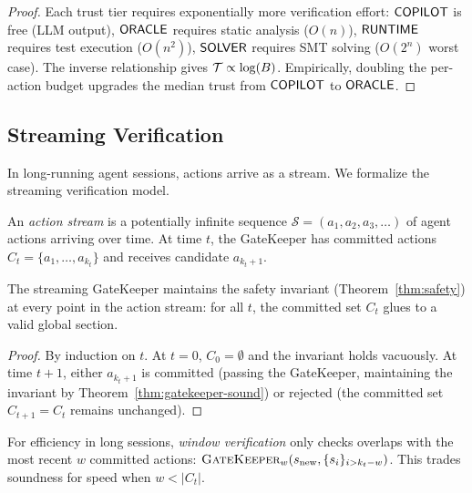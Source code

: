 \documentclass[11pt]{article}
\newcommand{\GateKeeper}{\textsc{GateKeeper}}
\begin{document}
\begin{proof}
Each trust tier requires exponentially more verification effort:
$\mathsf{COPILOT}$ is free (LLM output), $\mathsf{ORACLE}$ requires static
analysis ($O(n)$), $\mathsf{RUNTIME}$ requires test execution ($O(n^2)$),
$\mathsf{SOLVER}$ requires SMT solving ($O(2^n)$ worst case).  The inverse
relationship gives $\mathcal{T} \propto \log(B)$.  Empirically, doubling
the per-action budget upgrades the median trust from $\mathsf{COPILOT}$ to $\mathsf{ORACLE}$.
\end{proof}

\subsection{Streaming Verification}\label{subsec:streaming}

In long-running agent sessions, actions arrive as a stream.  We
formalize the streaming verification model.

\begin{definition}\label{def:action-stream}
An \emph{action stream} is a potentially infinite sequence
$\mathcal{S} = (a_1, a_2, a_3, \ldots)$ of agent actions arriving
over time.  At time $t$, the GateKeeper has committed actions
$C_t = \{a_1, \ldots, a_{k_t}\}$ and receives candidate $a_{k_t+1}$.
\end{definition}

\begin{theorem}\label{thm:streaming}
The streaming GateKeeper maintains the safety invariant
(Theorem~\ref{thm:safety}) at every point in the action stream:
for all $t$, the committed set $C_t$ glues to a valid global section.
\end{theorem}

\begin{proof}
By induction on $t$.  At $t = 0$, $C_0 = \emptyset$ and the invariant
holds vacuously.  At time $t+1$, either $a_{k_t+1}$ is committed
(passing the GateKeeper, maintaining the invariant by
Theorem~\ref{thm:gatekeeper-sound}) or rejected (the committed set
$C_{t+1} = C_t$ remains unchanged).
\end{proof}

\begin{definition}\label{def:window}
For efficiency in long sessions, \emph{window verification} only
checks overlaps with the most recent $w$ committed actions:
$\GateKeeper_w(s_{\mathrm{new}}, \{s_i\}_{i > k_t - w})$.  This
trades soundness for speed when $w < |C_t|$.
\end{definition}
\end{document}
